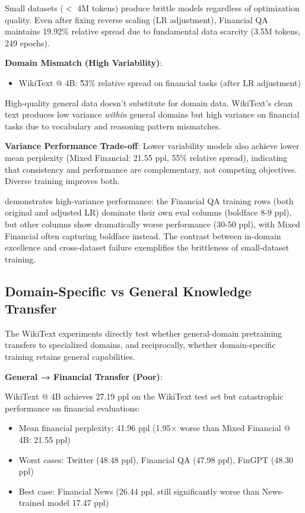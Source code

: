 Small datasets ($<$ 4M tokens) produce brittle models regardless of optimization quality. Even after fixing reverse scaling (LR adjustment), Financial QA maintains 19.92\% relative spread due to fundamental data scarcity (3.5M tokens, 249 epochs).

\textbf{Domain Mismatch (High Variability)}:
\begin{itemize}
\item WikiText @ 4B: \~53\% relative spread on financial tasks (after LR adjustment)
\end{itemize}

High-quality general data doesn't substitute for domain data. WikiText's clean text produces low variance \textit{within} general domains but high variance on financial tasks due to vocabulary and reasoning pattern mismatches.

\textbf{Variance Performance Trade-off}: Lower variability models also achieve lower mean perplexity (Mixed Financial: 21.55 ppl, 55\% relative spread), indicating that consistency and performance are complementary, not competing objectives. Diverse training improves both.



 demonstrates high-variance performance: the Financial QA training rows (both original and adjusted LR) dominate their own eval columns (boldface 8-9 ppl), but other columns show dramatically worse performance (30-50 ppl), with Mixed Financial often capturing boldface instead. The contrast between in-domain excellence and cross-dataset failure exemplifies the brittleness of small-dataset training.

\subsection{Domain-Specific vs General Knowledge Transfer}

The WikiText experiments directly test whether general-domain pretraining transfers to specialized domains, and reciprocally, whether domain-specific training retains general capabilities.

\textbf{General → Financial Transfer (Poor)}:

WikiText @ 4B achieves 27.19 ppl on the WikiText test set but catastrophic performance on financial evaluations:
\begin{itemize}
\item Mean financial perplexity: 41.96 ppl (1.95$\times$ worse than Mixed Financial @ 4B: 21.55 ppl)
\item Worst cases: Twitter (48.48 ppl), Financial QA (47.98 ppl), FinGPT (48.30 ppl)
\item Best case: Financial News (26.44 ppl, still significantly worse than News-trained model 17.47 ppl)
\end{itemize}

